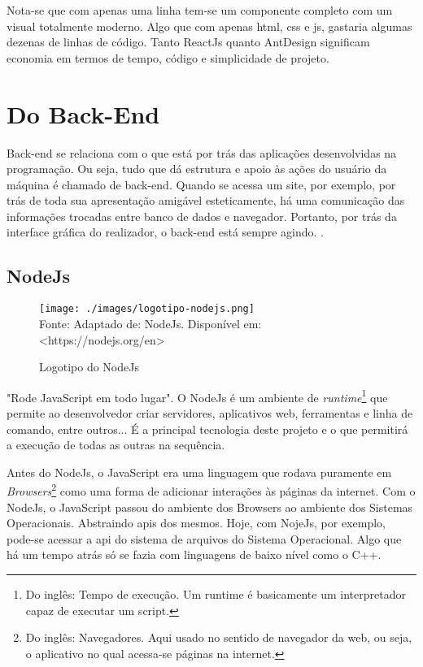 Nota-se que com apenas uma linha tem-se um componente completo com
um visual totalmente moderno. Algo que com apenas
\acrshort{html},
\acrshort{css}
e
\acrshort{js},
gastaria algumas dezenas de linhas de código.
Tanto ReactJs quanto AntDesign significam economia
em termos de tempo, código e simplicidade de projeto.

\section{Do Back-End}

Back-end se relaciona com o que está por trás das aplicações desenvolvidas na programação. Ou seja, tudo que dá estrutura e apoio às ações do usuário da máquina é chamado de back-end. Quando se acessa um site, por exemplo, por trás de toda sua apresentação amigável esteticamente, há uma comunicação das informações trocadas entre banco de dados e navegador. Portanto, por trás da interface gráfica do realizador, o back-end está sempre agindo.
\cite{totvs-back-end}.

\subsection{NodeJs}

\begin{figure}[H]
    \centering
    \caption{Logotipo do NodeJs}
    \texttt{[image: ./images/logotipo-nodejs.png]}
    \label{fig:logotipo-nodejs} \\
    \textnormal{\fontsize{10pt}{12pt}Fonte: Adaptado de: NodeJs. Disponível em: <https://nodejs.org/en>}
\end{figure}

"Rode JavaScript em todo lugar".
O NodeJs é um ambiente de
\textit{runtime}\footnote{Do inglês: Tempo de execução. Um runtime é basicamente um interpretador
    capaz de executar um script.
}
que permite ao desenvolvedor criar servidores, aplicativos
\acrshort{web},
ferramentas e linha de comando, entre outros...
É a principal tecnologia deste projeto e o que permitirá
a execução de todas as outras na sequência.

Antes do NodeJs, o JavaScript era uma linguagem que
rodava puramente em
\textit{Browsers}\footnote{Do inglês: Navegadores. Aqui usado no sentido de
    navegador da \acrshort{web}, ou seja,
    o aplicativo no qual acessa-se páginas na internet.
}
como uma forma de adicionar interações às páginas da internet.
Com o NodeJs, o JavaScript passou do ambiente dos Browsers
ao ambiente dos Sistemas Operacionais. Abstraindo
\acrshort{api}s
dos mesmos. Hoje, com NojeJs, por exemplo, pode-se
acessar a
\acrshort{api}
do sistema de arquivos do Sistema Operacional.
Algo que há um tempo atrás só se fazia com
linguagens de baixo nível como o C++.

